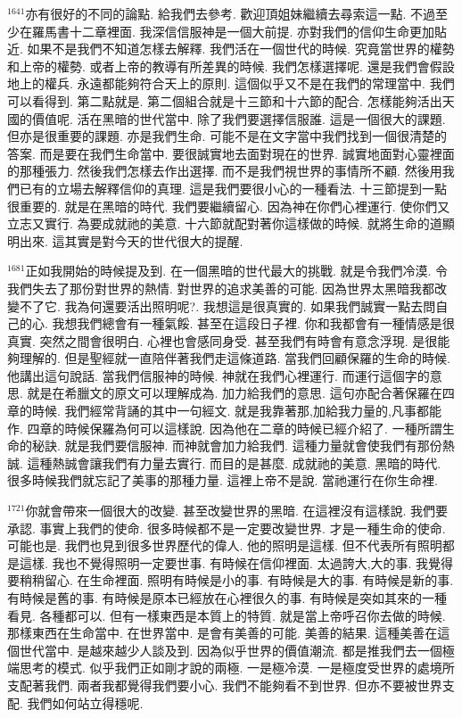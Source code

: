 \documentclass{book}
\begin{document}
$^{1641}$亦有很好的不同的論點.
給我們去參考.
歡迎頂姐妹繼續去尋索這一點.
不過至少在羅馬書十二章裡面.
我深信信服神是一個大前提.
亦對我們的信仰生命更加貼近.
如果不是我們不知道怎樣去解釋.
我們活在一個世代的時候.
究竟當世界的權勢和上帝的權勢.
或者上帝的教導有所差異的時候.
我們怎樣選擇呢.
還是我們會假設地上的權兵.
永遠都能夠符合天上的原則.
這個似乎又不是在我們的常理當中.
我們可以看得到.
第二點就是.
第二個組合就是十三節和十六節的配合.
怎樣能夠活出天國的價值呢.
活在黑暗的世代當中.
除了我們要選擇信服誰.
這是一個很大的課題.
但亦是很重要的課題.
亦是我們生命.
可能不是在文字當中我們找到一個很清楚的答案.
而是要在我們生命當中.
要很誠實地去面對現在的世界.
誠實地面對心靈裡面的那種張力.
然後我們怎樣去作出選擇.
而不是我們視世界的事情所不顧.
然後用我們已有的立場去解釋信仰的真理.
這是我們要很小心的一種看法.
十三節提到一點很重要的.
就是在黑暗的時代.
我們要繼續留心.
因為神在你們心裡運行.
使你們又立志又實行.
為要成就祂的美意.
十六節就配對著你這樣做的時候.
就將生命的道顯明出來.
這其實是對今天的世代很大的提醒.

$^{1681}$正如我開始的時候提及到.
在一個黑暗的世代最大的挑戰.
就是令我們冷漠.
令我們失去了那份對世界的熱情.
對世界的追求美善的可能.
因為世界太黑暗我都改變不了它.
我為何還要活出照明呢?.
我想這是很真實的.
如果我們誠實一點去問自己的心.
我想我們總會有一種氣餒.
甚至在這段日子裡.
你和我都會有一種情感是很真實.
突然之間會很明白.
心裡也會感同身受.
甚至我們有時會有意念浮現.
是很能夠理解的.
但是聖經就一直陪伴著我們走這條道路.
當我們回顧保羅的生命的時候.
他講出這句說話.
當我們信服神的時候.
神就在我們心裡運行.
而運行這個字的意思.
就是在希臘文的原文可以理解成為.
加力給我們的意思.
這句亦配合著保羅在四章的時候.
我們經常背誦的其中一句經文.
就是我靠著那,加給我力量的,凡事都能作.
四章的時候保羅為何可以這樣說.
因為他在二章的時候已經介紹了.
一種所謂生命的秘訣.
就是我們要信服神.
而神就會加力給我們.
這種力量就會使我們有那份熱誠.
這種熱誠會讓我們有力量去實行.
而目的是甚麼.
成就祂的美意.
黑暗的時代.
很多時候我們就忘記了美事的那種力量.
這裡上帝不是說.
當祂運行在你生命裡.

$^{1721}$你就會帶來一個很大的改變.
甚至改變世界的黑暗.
在這裡沒有這樣說.
我們要承認.
事實上我們的使命.
很多時候都不是一定要改變世界.
才是一種生命的使命.
可能也是.
我們也見到很多世界歷代的偉人.
他的照明是這樣.
但不代表所有照明都是這樣.
我也不覺得照明一定要世事.
有時候在信仰裡面.
太過誇大,大的事.
我覺得要稍稍留心.
在生命裡面.
照明有時候是小的事.
有時候是大的事.
有時候是新的事.
有時候是舊的事.
有時候是原本已經放在心裡很久的事.
有時候是突如其來的一種看見.
各種都可以.
但有一樣東西是本質上的特質.
就是當上帝呼召你去做的時候.
那樣東西在生命當中.
在世界當中.
是會有美善的可能.
美善的結果.
這種美善在這個世代當中.
是越來越少人談及到.
因為似乎世界的價值潮流.
都是推我們去一個極端思考的模式.
似乎我們正如剛才說的兩極.
一是極冷漠.
一是極度受世界的處境所支配著我們.
兩者我都覺得我們要小心.
我們不能夠看不到世界.
但亦不要被世界支配.
我們如何站立得穩呢.
\end{document}
